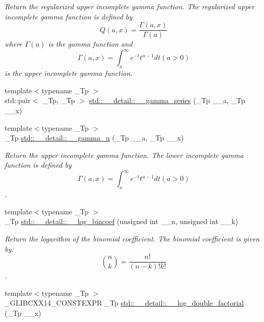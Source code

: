 \begin{DoxyCompactItemize}
\begin{DoxyCompactList}\small\item\em Return the regularized upper incomplete gamma function. The regularized upper incomplete gamma function is defined by \[ Q(a,x) = \frac{\Gamma(a,x)}{\Gamma(a)} \] where $ \Gamma(a) $ is the gamma function and \[ \Gamma(a,x) = \int_x^\infty e^{-t}t^{a-1}dt (a > 0) \] is the upper incomplete gamma function. \end{DoxyCompactList}\item 
{\footnotesize template$<$typename \+\_\+\+Tp $>$ }\\std\+::pair$<$ \+\_\+\+Tp, \+\_\+\+Tp $>$ \hyperlink{namespacestd_1_1____detail_aa480c595e1c5b894d76398cf0e8eb02b}{std\+::\+\_\+\+\_\+detail\+::\+\_\+\+\_\+gamma\+\_\+series} (\+\_\+\+Tp \+\_\+\+\_\+a, \+\_\+\+Tp \+\_\+\+\_\+x)
\item 
{\footnotesize template$<$typename \+\_\+\+Tp $>$ }\\\+\_\+\+Tp \hyperlink{namespacestd_1_1____detail_a3ba60e25252f0a54b1e70412df0d1068}{std\+::\+\_\+\+\_\+detail\+::\+\_\+\+\_\+gamma\+\_\+u} (\+\_\+\+Tp \+\_\+\+\_\+a, \+\_\+\+Tp \+\_\+\+\_\+x)
\begin{DoxyCompactList}\small\item\em Return the upper incomplete gamma function. The lower incomplete gamma function is defined by \[ \Gamma(a,x) = \int_x^\infty e^{-t}t^{a-1}dt (a > 0) \]. \end{DoxyCompactList}\item 
{\footnotesize template$<$typename \+\_\+\+Tp $>$ }\\\+\_\+\+Tp \hyperlink{namespacestd_1_1____detail_a152324942f37ae3c6fc65aec1f17049e}{std\+::\+\_\+\+\_\+detail\+::\+\_\+\+\_\+log\+\_\+bincoef} (unsigned int \+\_\+\+\_\+n, unsigned int \+\_\+\+\_\+k)
\begin{DoxyCompactList}\small\item\em Return the logarithm of the binomial coefficient. The binomial coefficient is given by\+: \[ \binom{n}{k} = \frac{n!}{(n-k)! k!} \]. \end{DoxyCompactList}\item 
{\footnotesize template$<$typename \+\_\+\+Tp $>$ }\\\+\_\+\+G\+L\+I\+B\+C\+X\+X14\+\_\+\+C\+O\+N\+S\+T\+E\+X\+P\+R \+\_\+\+Tp \hyperlink{namespacestd_1_1____detail_a0de46e790512550b535bdda97e11e1b5}{std\+::\+\_\+\+\_\+detail\+::\+\_\+\+\_\+log\+\_\+double\+\_\+factorial} (\+\_\+\+Tp \+\_\+\+\_\+x)
\item 

\end{DoxyCompactItemize}
